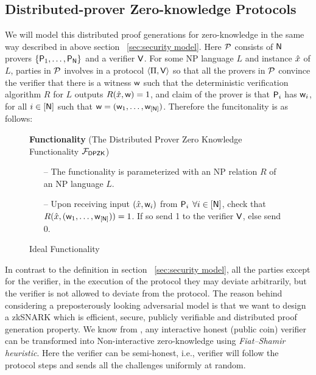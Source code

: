\subsection{Distributed-prover Zero-knowledge Protocols}

\noindent We will model this distributed proof generations for zero-knowledge in the same way described in above section ~\ref{sec:security model}. Here $\mathcal{P}$ consists of $\mathsf{N}$ provers $\{\mathsf{P}_1, \ldots, \mathsf{P}_{\mathsf{N}}\}$ and a verifier $\mathsf{V}$. For some NP language $L$ and instance $\hat{x}$ of $L$, parties in $\mathcal{P}$ involves in a protocol $\langle \Pi,\mathsf{V}\rangle$ so that all the provers in $\mathcal{P}$ convince the verifier that there is a witness $\mathsf{w}$ such that the deterministic verification algorithm $R$ for $L$ outputs $R(\hat{x},\mathsf{w}) = 1$, and claim of the prover is that $\mathsf{P}_i$ has $\mathsf{w}_i$, for all $i\in[\mathsf{N}]$ such that $\mathsf{w} = (\mathsf{w}_1, \ldots, \mathsf{w}_{[\mathsf{N}]})$. Therefore the funcitonality is as follows: 
\begin{figure}[H]
	\centering
	\begin{framed}
		\textbf{Functionality} (The Distributed Prover Zero Knowledge Functionality $\mathcal{F}_{\mathsf{DPZK}}$)
		\begin{itemize}
			\item[--] The functionality is parameterized with an NP relation $R$ of an NP language $L$.
			\item[--] Upon receiving input $(\hat{x}, \mathsf{w}_i)$ from $\mathsf{P}_i$ $\forall i\in[\mathsf{N}]$, check that $R(\hat{x}, (\mathsf{w}_1, \ldots, \mathsf{w}_{[\mathsf{N}]})) = 1$. If so send 1 to the verifier $\mathsf{V}$, else send 0. 
		\end{itemize}
	\end{framed}
	\caption{Ideal Functionality}
\end{figure} \label{func:DPZK}
In contrast to the definition in section ~\ref{sec:security model}, all the parties except for the verifier, in the execution of the protocol they may deviate arbitrarily, but the verifier is not allowed to deviate from the protocol. The reason behind considering a preposterously looking adversarial model is that we want to design a zkSNARK which is efficient, secure, publicly verifiable and distributed proof generation property. We know from \cite{}, any interactive honest (public coin) verifier can be transformed into Non-interactive zero-knowledge using \textit{Fiat–Shamir heuristic}. Here the verifier can be semi-honest, i.e., verifier will follow the protocol steps and sends all the challenges uniformly at random.

